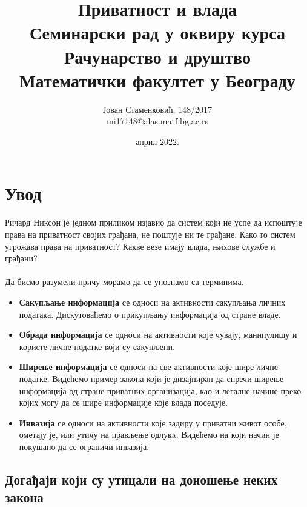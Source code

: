 \documentclass{article}
\title{\Huge{Приватност и влада}\\
{\large{Семинарски рад у оквиру курса\\Рачунарство и друштво \\
        Математички факултет у Београду}}}
\author{Јован Стаменковић, 148/2017\\mi17148@alas.matf.bg.ac.rs}
\date{април 2022.}
\begin{document}
\maketitle

\tableofcontents

\newpage
\section{Увод}

Ричард Никсон је једном приликом изјавио да систем који не успе да испоштује права на приватност својих грађана, не поштује ни те грађане. Како то систем угрожава права на приватност? Какве везе имају влада, њихове службе и грађани?
\\\\
Да бисмо разумели причу морамо да се упознамо са терминима.

\begin{itemize}
  \item \textbf{Сакупљање информација} се односи на активности сакупљања личних података. Дискутоваћемо о прикупљању информација од стране владе.
  \item \textbf{Обрада информација} се односи на активности које чувају, манипулишу и користе личне податке који су сакупљени.
  \item \textbf{Ширење информација} се односи на све активности које шире личне податке. Видећемо пример закона који је дизајниран да спречи ширење информација од стране приватних организација, као и легалне начине преко којих могу да се шире информације које влада поседује.
  \item \textbf{Инвазија} се односи на активности које задиру у приватни живот особе, ометају је, или утичу на прављење одлукa. Видећемо на који начин је покушано да се ограничи инвазија.
\end{itemize}

\subsection{Догађаји који су утицали на доношење неких закона}
\end{document}
